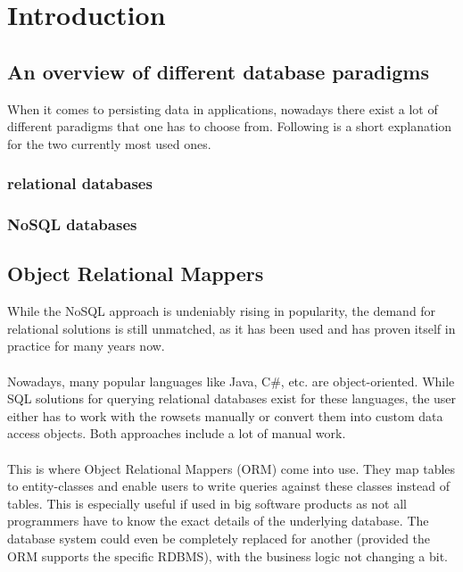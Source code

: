 \section{Introduction}\label{einleitung}

\subsection{An overview of different database paradigms}

When it comes to persisting data in applications, nowadays there exist a lot of different
paradigms that one has to choose from. Following is a short explanation for the two currently most used ones.

\subsubsection{relational databases}

\subsubsection{NoSQL databases}

\subsection{Object Relational Mappers}

While the NoSQL approach is undeniably rising in popularity, the demand for
relational solutions is still unmatched, as it has been used and has proven itself in practice
for many years now.
\\\\
Nowadays, many popular languages like Java, C\#, etc. are object-oriented.
While SQL solutions for querying relational databases exist for these languages, the user either has to work with the rowsets manually or convert them into custom data access objects. Both approaches include a lot of manual work.
\\\\
This is where Object Relational Mappers (ORM) come into use. They map tables to entity-classes and
enable users to write queries against these classes instead of tables. This is especially useful if used
in big software products as not all programmers have to know the exact details of the underlying database. The database system could even be completely replaced for another (provided the ORM supports the specific RDBMS), with the business logic not changing a bit.

